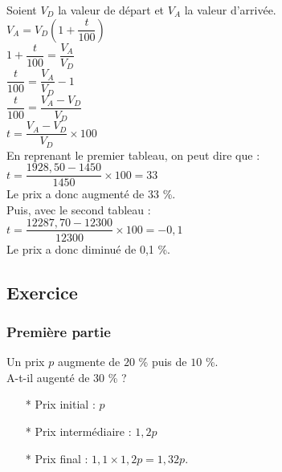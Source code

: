 Soient $V_D$ la valeur de départ et $V_A$ la valeur d'arrivée. \\

$V_A = V_D \left(1 + \dfrac{t}{100} \right) $ \\

$ 1 + \dfrac{t}{100} = \dfrac{V_A}{V_D} $ \\

$ \dfrac{t}{100} = \dfrac{V_A}{V_D} - 1 $ \\

$ \dfrac{t}{100} = \dfrac{V_A - V_D}{V_D} $ \\

$ t = \dfrac{V_A - V_D}{V_D} \times 100 $ \\

En reprenant le premier tableau, on peut dire que : \\

$ t = \dfrac{1928,50 - 1450}{1450} \times 100 = 33 $ \\

Le prix a donc augmenté de 33 \%. \\

Puis, avec le second tableau :  \\

$ t = \dfrac{12287,70 - 12300}{12300} \times 100 = -0,1 $ \\

Le prix a donc diminué de 0,1 \%.

\newpage

\subsection{Exercice }

\subsubsection*{Première partie}

Un prix $p$ augmente de $20$ \% puis de $10$ \%. \\

A-t-il augenté de $30$ \% ? \\

\begin{enumerate}
\item[*] Prix initial : $p$
\item[*] Prix intermédiaire : $1,2p$
\item[*] Prix final : $1,1 \times 1,2p = 1,32 p $. 
\end{enumerate} 

